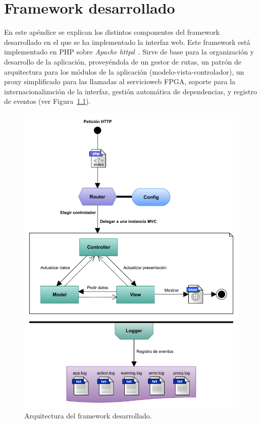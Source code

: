 \chapter{Framework desarrollado\label{extra:frameworkDesarrollado}}

En este apéndice se explican los distintos componentes del \gls{framework} desarrollado en el que se ha implementado la interfaz web.
Este \gls{framework} está implementado en \gls{PHP} sobre \textit{Apache httpd}~\cite{httpd}.
Sirve de base para la organización y desarrollo de la aplicación, proveyéndola de un gestor de rutas, un patrón de arquitectura para los módulos de la aplicación (modelo-vista-controlador), un \gls{proxy} simplificado para las llamadas al \gls{servicioweb} \gls{FPGA}, soporte para la internacionalización de la interfaz, gestión automática de dependencias, y registro de eventos (ver Figura~\ref{fig:framework}).

\begin{figure}[!htp]
  \centering
  \includegraphics[width=\textwidth,clip=true]{graphics/framework}
  \caption{Arquitectura del \gls{framework} desarrollado.}
  \label{fig:framework}
\end{figure}



